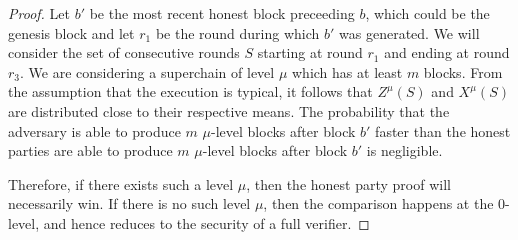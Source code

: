 \begin{proof}
    Let $b'$ be the most recent honest block preceeding $b$, which could be the
    genesis block and let $r_1$ be the round during which $b'$ was generated.
    We will consider the set of consecutive rounds $S$ starting at round $r_1$
    and ending at round $r_3$. We are considering a superchain of level
    $\mu$ which has at least $m$ blocks. From the assumption that the
    execution is typical, it follows that $Z^\mu(S)$ and $X^\mu(S)$ are
    distributed close to their respective means. The probability that the
    adversary is able to produce $m$ $\mu$-level blocks after block $b'$ faster
    than the honest parties are able to produce $m$ $\mu$-level blocks after
    block $b'$ is negligible.

    Therefore, if there exists such a level $\mu$, then the honest party proof
    will necessarily win. If there is no such level $\mu$, then the comparison
    happens at the $0$-level, and hence reduces to the security of a full
    verifier.
\end{proof}
